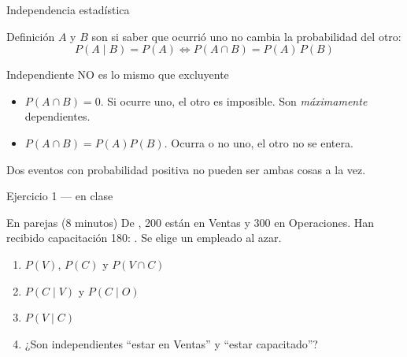 \documentclass[aspectratio=169,10pt]{beamer}
\begin{document}
\begin{frame}{Independencia estadística}
  \begin{block}{Definición}
    \small
    $A$ y $B$ son  si saber que ocurrió uno no cambia
    la probabilidad del otro:
    \[ P(A\mid B)=P(A) \iff P(A\cap B)=P(A)\,P(B) \]
  \end{block}

  \vspace{0.2cm}
  \begin{alertblock}{Independiente NO es lo mismo que excluyente}
    \footnotesize
    \begin{itemize}
      \item {} $P(A\cap B)=0$. Si ocurre uno, el otro es
            imposible. Son \emph{máximamente} dependientes.
      \item {} $P(A\cap B)=P(A)P(B)$. Ocurra o no uno, el
            otro no se entera.
    \end{itemize}
    Dos eventos con probabilidad positiva no pueden ser ambas cosas a la vez.
  \end{alertblock}
\end{frame}

\begin{frame}{Ejercicio 1 — en clase}
  \begin{alertblock}{En parejas (8 minutos)}
    De , 200 están en Ventas y 300 en Operaciones. Han
    recibido capacitación 180: . Se
    elige un empleado al azar.

    \vspace{0.25cm}
    \begin{enumerate}
      \item $P(V)$, $P(C)$ y $P(V\cap C)$
      \item $P(C\mid V)$ y $P(C\mid O)$
      \item $P(V\mid C)$
      \item ¿Son independientes ``estar en Ventas'' y ``estar capacitado''?
    \end{enumerate}
  \end{alertblock}
\end{frame}
\end{document}
